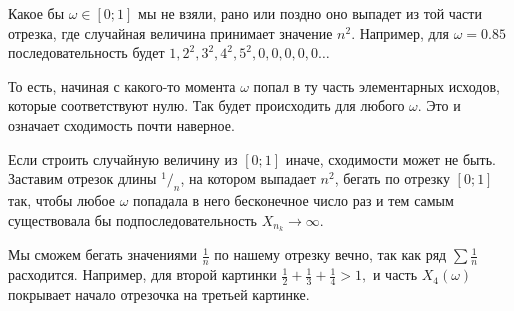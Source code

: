 \documentclass[12pt, a4paper, oneside]{article}
\begin{document}
Какое бы $\omega \in [0;1]$ мы не взяли, рано или поздно оно выпадет из той части отрезка, где случайная величина принимает значение $n^2$. Например, для $\omega = 0.85$ последовательность будет $1, 2^2, 3^2, 4^2, 5^2, 0, 0, 0, 0, 0 \ldots$

То есть, начиная с какого-то момента $\omega$ попал в ту часть элементарных исходов, которые соответствуют нулю. Так будет происходить для любого $\omega$. Это и означает сходимость почти наверное. 

Если строить случайную величину из $[0;1]$ иначе, сходимости может не быть. Заставим отрезок длины $^1/_n$, на котором выпадает $n^2$, бегать по отрезку $[0; 1]$ так, чтобы любое $\omega$ попадала в него бесконечное число раз и тем самым существовала бы подпоследовательность $X_{n_k} \to \infty$. 

Мы сможем бегать значениями $\frac{1}{n}$ по нашему отрезку вечно, так как ряд $\sum \frac{1}{n}$ расходится. Например, для второй картинки $\frac{1}{2} + \frac{1}{3} + \frac{1}{4} > 1,$ и часть $X_4(\omega)$ покрывает начало отрезочка на третьей картинке. 

\end{document}
